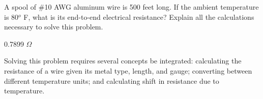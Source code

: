 

A spool of \#10 AWG aluminum wire is 500 feet long.  If the ambient temperature is 80$^{o}$ F, what is its end-to-end electrical resistance?  Explain all the calculations necessary to solve this problem.







0.7899 $\Omega$







Solving this problem requires several concepts be integrated: calculating the resistance of a wire given its metal type, length, and gauge; converting between different temperature units; and calculating shift in resistance due to temperature.




